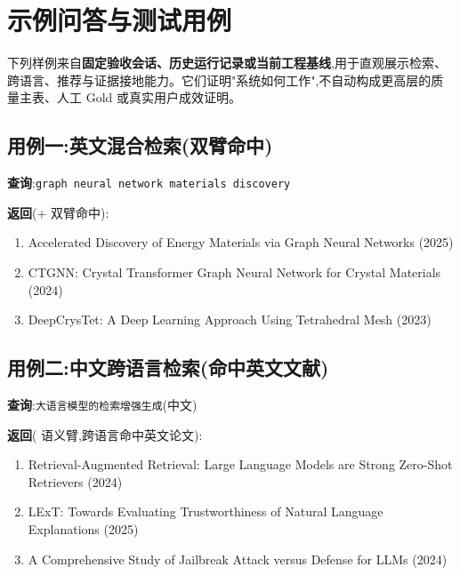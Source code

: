 \section{示例问答与测试用例}

下列样例来自\textbf{固定验收会话、历史运行记录或当前工程基线},用于直观展示检索、跨语言、推荐与证据接地能力。它们证明"系统如何工作",不自动构成更高层的质量主表、人工 Gold 或真实用户成效证明。

\subsection{用例一:英文混合检索(双臂命中)}
\begin{plainbox}
\textbf{查询}:\texttt{graph neural network materials discovery}\par\vspace{2pt}
\textbf{返回}(+ 双臂命中):
\begin{enumerate}
\item Accelerated Discovery of Energy Materials via Graph Neural Networks \hfill(2025)
\item CTGNN: Crystal Transformer Graph Neural Network for Crystal Materials \hfill(2024)
\item DeepCrysTet: A Deep Learning Approach Using Tetrahedral Mesh \hfill(2023)
\end{enumerate}
\end{plainbox}

\subsection{用例二:中文跨语言检索(命中英文文献)}
\begin{plainbox}
\textbf{查询}:\texttt{大语言模型的检索增强生成}(中文)\par\vspace{2pt}
\textbf{返回}( 语义臂,跨语言命中英文论文):
\begin{enumerate}
\item Retrieval-Augmented Retrieval: Large Language Models are Strong Zero-Shot Retrievers \hfill(2024)
\item LExT: Towards Evaluating Trustworthiness of Natural Language Explanations \hfill(2025)
\item A Comprehensive Study of Jailbreak Attack versus Defense for LLMs \hfill(2024)
\end{enumerate}
\end{plainbox}

